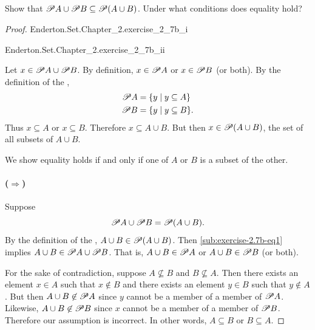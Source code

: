 \documentclass{report}
\begin{document}
\subsection{}%
\label{sub:exercise-2.7b}

Show that $\mathscr{P}A \cup \mathscr{P}B \subseteq \mathscr{P}(A \cup B)$.
Under what conditions does equality hold?

\begin{proof}

  \statementpadding

    {Enderton.Set.Chapter\_2.exercise\_2\_7b\_i}

    {Enderton.Set.Chapter\_2.exercise\_2\_7b\_ii}

  Let $x \in \mathscr{P}A \cup \mathscr{P}B$.
  By definition, $x \in \mathscr{P}A$ or $x \in \mathscr{P}B$ (or both).
  By the definition of the ,
    \begin{align*}
      \mathscr{P}A &= \{ y \mid y \subseteq A \} \\
      \mathscr{P}B &= \{ y \mid y \subseteq B \}.
    \end{align*}
  Thus $x \subseteq A$ or $x \subseteq B$.
  Therefore $x \subseteq A \cup B$.
  But then $x \in \mathscr{P}(A \cup B)$, the set of all subsets of $A \cup B$.

  \suitdivider

  We show equality holds if and only if one of $A$ or $B$ is a subset of the
    other.

  \paragraph{($\Rightarrow$)}%
  \label{par:exercise-2.7b-right}

    Suppose
      \begin{equation}
        \label{sub:exercise-2.7b-eq1}
        \mathscr{P}A \cup \mathscr{P}B = \mathscr{P}(A \cup B).
      \end{equation}
    By the definition of the ,
      $A \cup B \in \mathscr{P}(A \cup B)$.
    Then \eqref{sub:exercise-2.7b-eq1} implies
      $A \cup B \in \mathscr{P}A \cup \mathscr{P}B$.
    That is, $A \cup B \in \mathscr{P}A$ or $A \cup B \in \mathscr{P}B$ (or
      both).

    For the sake of contradiction, suppose $A \not\subseteq B$ and
      $B \not\subseteq A$.
    Then there exists an element $x \in A$ such that $x \not\in B$ and there
      exists an element $y \in B$ such that $y \not\in A$.
    But then $A \cup B \not\in \mathscr{P}A$ since $y$ cannot be a member of a
      member of $\mathscr{P}A$.
    Likewise, $A \cup B \not\in \mathscr{P}B$ since $x$ cannot be a member of a
      member of $\mathscr{P}B$.
    Therefore our assumption is incorrect.
    In other words, $A \subseteq B$ or $B \subseteq A$.


\end{proof}
\end{document}
